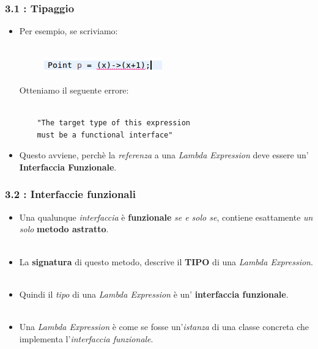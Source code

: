 \documentclass{beamer}
\begin{document}
\begin{frame}[fragile]
	\frametitle{\textbf{3.1 : Tipaggio}}
	\begin{itemize}
		\item 
			Per esempio, se scriviamo:\\\
			\begin{figure}
				\centering
				\includegraphics[width=0.3\linewidth]{image/target.png}
				\label{fig:target}
			\end{figure}
			Otteniamo il seguente errore:\\\
\begin{lstlisting}
	"The target type of this expression
	must be a functional interface"
\end{lstlisting}
		\item 
			Questo avviene, perchè la \textit{referenza} a una \textit{Lambda Expression} deve essere un' \textbf{Interfaccia Funzionale}.
	\end{itemize}
\end{frame}


\begin{frame}
	\frametitle{\textbf{3.2 : Interfaccie funzionali}}
	\begin{itemize}
		\item
			Una qualunque \textit{interfaccia} è \textbf{funzionale} \textit{se e solo se}, contiene esattamente \textit{un solo} \textbf{metodo astratto}.\\\
		\item 
			La \textbf{signatura} di questo metodo, descrive il \textbf{TIPO} di una \textit{Lambda Expression}.\\\
		\item 
			Quindi il \textit{tipo} di una \textit{Lambda Expression} è un' \textbf{interfaccia funzionale}.\\\
		\item 
			Una \textit{Lambda Expression} è come se fosse un'\textit{istanza} di una classe concreta che implementa l'\textit{interfaccia funzionale}.
	\end{itemize}
\end{frame}

\end{document}
